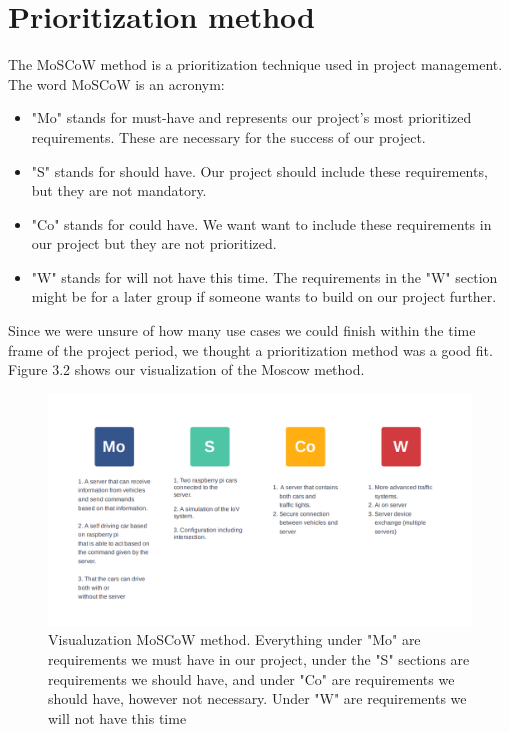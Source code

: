 \section{Prioritization method}
The MoSCoW method is a prioritization technique used in project management. The word MoSCoW is an acronym:

\begin{itemize}
	\item "Mo" stands for must-have and represents our project's most prioritized requirements. These are necessary for the success of our project.
	\item "S" stands for should have. Our project should include these requirements, but they are not mandatory.
	\item "Co" stands for could have. We want want to include these requirements in our project but they are not prioritized.
	\item "W" stands for will not have this time. The requirements in the "W" section might be for a later group if someone wants to build on our project further.
\end{itemize}

Since we were unsure of how many use cases we could finish within the time frame of the project period, we thought a prioritization method was a good fit. Figure 3.2 shows our visualization of the Moscow method.

\begin{figure}[h!]
	\centering
	\includegraphics[width=1\linewidth]{figures/MosCoW_method}
	\caption[MosCoW method]{Visualuzation MoSCoW method. Everything under "Mo" are requirements we must have in our project, under the "S" sections are requirements we should have, and under "Co" are requirements we should have, however not necessary. Under "W" are requirements we will not have this time}
	\label{fig:moscowmethod}
\end{figure}


